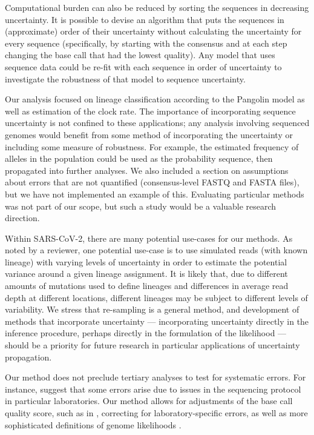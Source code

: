 \documentclass[12pt]{article}
\begin{document}
Computational burden can also be reduced by sorting the sequences in decreasing uncertainty.
It is possible to devise an algorithm that puts the sequences in (approximate) order of their uncertainty without calculating the uncertainty for every sequence (specifically, by starting with the consensus and at each step changing the base call that had the lowest quality).
Any model that uses sequence data could be re-fit with each sequence in order of uncertainty to investigate the robustness of that model to sequence uncertainty.

Our analysis focused on lineage classification according to the Pangolin model as well as estimation of the clock rate.
The importance of incorporating sequence uncertainty is not confined to these applications; any analysis involving sequenced genomes would benefit from some method of incorporating the uncertainty or including some measure of robustness.
For example, the estimated frequency of alleles in the population could be used as the probability sequence, then propagated into further analyses.
We also included a section on assumptions about errors that are not quantified (consensus-level FASTQ and FASTA files), but we have not implemented an example of this.
Evaluating particular methods was not part of our scope, but such a study would be a valuable research direction.

Within SARS-CoV-2, there are many potential use-cases for our methods.
As noted by a reviewer, one potential use-case is to use simulated reads (with known lineage) with varying levels of uncertainty in order to estimate the potential variance around a given lineage assignment.
It is likely that, due to different amounts of mutations used to define lineages and differences in average read depth at different locations, different lineages may be subject to different levels of variability.
We stress that re-sampling is a general method, and development of methods that incorporate uncertainty --- \eg incorporating uncertainty directly in the inference procedure, perhaps directly in the formulation of the likelihood --- should be a priority for future research in particular applications of uncertainty propagation.

Our method does not preclude tertiary analyses to test for systematic errors.
For instance, \cite{demaioIssuesSARSCoV2Sequencing2020} suggest that some errors arise due to issues in the sequencing protocol in particular laboratories.
Our method allows for adjustments of the base call quality score, such as in \cite{brockmanQualityScoresSNP2008}, correcting for laboratory-specific errors, as well as more sophisticated definitions of genome likelihoods \cite[\eg ][]{liAdjustQualityScores2004, depristoFrameworkVariationDiscovery2011, liSNPDetectionMassively2009}.
\end{document}
